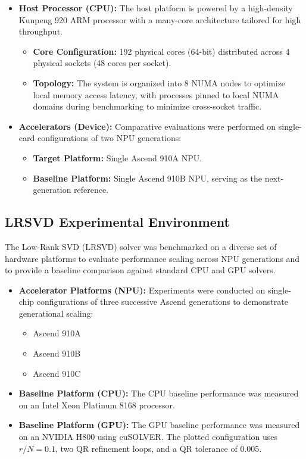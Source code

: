 \documentclass{article}
\begin{document}
\begin{itemize}
    \item \textbf{Host Processor (CPU):} The host platform is powered by a high-density Kunpeng 920 ARM processor with a many-core architecture tailored for high throughput.
    \begin{itemize}
        \item \textbf{Core Configuration:} 192 physical cores (64-bit) distributed across 4 physical sockets (48 cores per socket).
        \item \textbf{Topology:} The system is organized into 8 NUMA nodes to optimize local memory access latency, with processes pinned to local NUMA domains during benchmarking to minimize cross-socket traffic.
    \end{itemize}
    \item \textbf{Accelerators (Device):} Comparative evaluations were performed on single-card configurations of two NPU generations:
    \begin{itemize}
        \item \textbf{Target Platform:} Single Ascend 910A NPU.
        \item \textbf{Baseline Platform:} Single Ascend 910B NPU, serving as the next-generation reference.
    \end{itemize}
\end{itemize}

\subsection{LRSVD Experimental Environment}
The Low-Rank SVD (LRSVD) solver was benchmarked on a diverse set of hardware platforms to evaluate performance scaling across NPU generations and to provide a baseline comparison against standard CPU and GPU solvers.

\begin{itemize}
    \item \textbf{Accelerator Platforms (NPU):} Experiments were conducted on single-chip configurations of three successive Ascend generations to demonstrate generational scaling:
    \begin{itemize}
        \item Ascend 910A
        \item Ascend 910B
        \item Ascend 910C
    \end{itemize}
    \item \textbf{Baseline Platform (CPU):} The CPU baseline performance was measured on an Intel Xeon Platinum 8168 processor.
    \item \textbf{Baseline Platform (GPU):}
    The GPU baseline performance was measured on an NVIDIA H800 using cuSOLVER. The plotted configuration uses $r/N=0.1$, two QR refinement loops, and a QR tolerance of 0.005.
\end{itemize}
\end{document}
